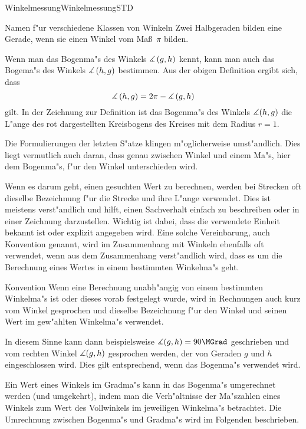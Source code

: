 \begin{MXContent}{Winkelmessung}{Winkelmessung}{STD}
\begin{MXInfo}{Namen f"ur verschiedene Klassen von Winkeln}
Zwei Halbgeraden bilden eine Gerade, wenn sie einen Winkel vom Ma\ss~$\pi$ bilden.
\end{MXInfo}

Wenn man das Bogenma"s des Winkels $\measuredangle \left( g, h \right)$ kennt, 
kann man auch das Bogema"s des Winkels $\measuredangle \left( h, g \right)$ 
bestimmen. Aus der obigen Definition  ergibt sich, 
dass 
\[
   \Mmeasuredangle \left( h, g \right)
 = 2 \pi - \Mmeasuredangle \left( g, h \right) %
\]
gilt. In der Zeichnung zur Definition  ist das 
Bogenma"s des Winkels $\measuredangle(h,g)$ die L"ange des rot dargestellten 
Kreisbogens des Kreises mit dem Radius $r = 1$.

Die Formulierungen der letzten S"atze klingen m"oglicherweise umst"andlich.
Dies liegt vermutlich auch daran, dass genau zwischen Winkel und einem Ma"s, 
hier dem Bogenma"s, f"ur den Winkel unterschieden wird.

Wenn es darum geht, einen gesuchten Wert zu berechnen, werden bei Strecken 
oft dieselbe Bezeichnung f"ur die Strecke und ihre L"ange verwendet. Dies 
ist meistens verst"andlich und hilft, einen Sachverhalt einfach zu beschreiben
oder in einer Zeichnung darzustellen. Wichtig ist dabei, dass die verwendete 
Einheit bekannt ist oder explizit angegeben wird.
Eine solche Vereinbarung, auch Konvention genannt, wird im Zusammenhang mit 
Winkeln ebenfalls oft verwendet, wenn aus dem Zusammenhang verst"andlich wird,
dass es um die Berechnung eines Wertes in einem bestimmten Winkelma"s geht.

\begin{MXInfo}{Konvention}
Wenn eine Berechnung unabh"angig von einem bestimmten Winkelma"s ist oder 
dieses vorab festgelegt wurde, wird in Rechnungen auch kurz vom Winkel 
gesprochen und dieselbe Bezeichnung f"ur den Winkel und seinen Wert im 
gew"ahlten Winkelma"s verwendet.
\end{MXInfo}
In diesem Sinne kann dann beispielsweise $\Mmeasuredangle(g,h) = 90\MGrad$ 
geschrieben und vom rechten Winkel $\measuredangle(g,h)$ gesprochen werden, 
der von Geraden $g$ und $h$ eingeschlossen wird.
Dies gilt entsprechend, wenn das Bogenma"s verwendet wird.

Ein Wert eines Winkels im Gradma"s kann in das Bogenma"s umgerechnet werden 
(und umgekehrt), indem man die Verh"altnisse der Ma"szahlen eines Winkels zum 
Wert des Vollwinkels im jeweiligen Winkelma"s betrachtet. Die Umrechnung 
zwischen Bogenma"s und Gradma"s wird im Folgenden beschrieben.


\end{MXContent}
